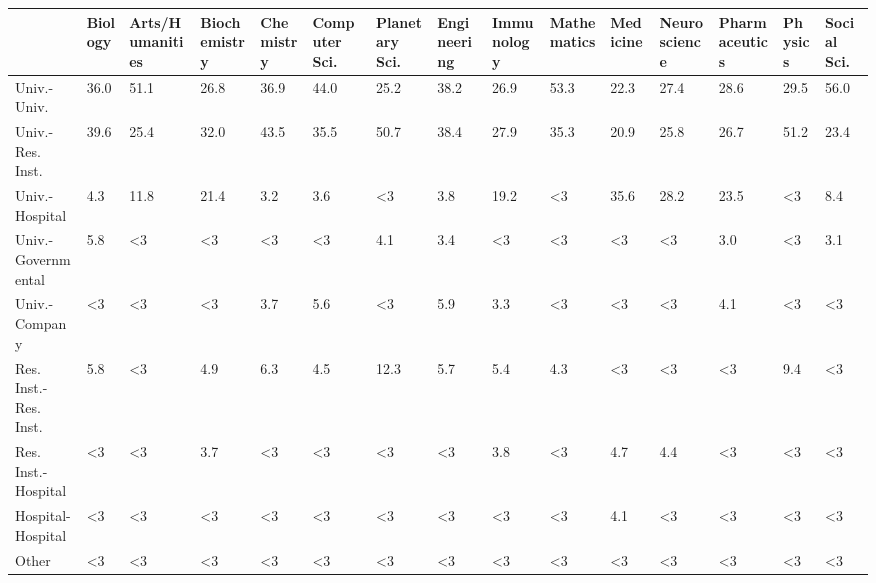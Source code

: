 \begin{tabular}{lllllllllllllll}
\toprule
{} & Biology & Arts/Humanities & Biochemistry & Chemistry & Computer Sci. & Planetary Sci. & Engineering & Immunology & Mathematics & Medicine & Neuroscience & Pharmaceutics & Physics & Social Sci. \\
\midrule
Univ.-Univ.           &    36.0 &            51.1 &         26.8 &      36.9 &          44.0 &           25.2 &        38.2 &       26.9 &        53.3 &     22.3 &         27.4 &          28.6 &    29.5 &        56.0 \\
Univ.-Res. Inst.      &    39.6 &            25.4 &         32.0 &      43.5 &          35.5 &           50.7 &        38.4 &       27.9 &        35.3 &     20.9 &         25.8 &          26.7 &    51.2 &        23.4 \\
Univ.-Hospital        &     4.3 &            11.8 &         21.4 &       3.2 &           3.6 &             <3 &         3.8 &       19.2 &          <3 &     35.6 &         28.2 &          23.5 &      <3 &         8.4 \\
Univ.-Governmental    &     5.8 &              <3 &           <3 &        <3 &            <3 &            4.1 &         3.4 &         <3 &          <3 &       <3 &           <3 &           3.0 &      <3 &         3.1 \\
Univ.-Company         &      <3 &              <3 &           <3 &       3.7 &           5.6 &             <3 &         5.9 &        3.3 &          <3 &       <3 &           <3 &           4.1 &      <3 &          <3 \\
Res. Inst.-Res. Inst. &     5.8 &              <3 &          4.9 &       6.3 &           4.5 &           12.3 &         5.7 &        5.4 &         4.3 &       <3 &           <3 &            <3 &     9.4 &          <3 \\
Res. Inst.-Hospital   &      <3 &              <3 &          3.7 &        <3 &            <3 &             <3 &          <3 &        3.8 &          <3 &      4.7 &          4.4 &            <3 &      <3 &          <3 \\
Hospital-Hospital     &      <3 &              <3 &           <3 &        <3 &            <3 &             <3 &          <3 &         <3 &          <3 &      4.1 &           <3 &            <3 &      <3 &          <3 \\
Other                 &      <3 &              <3 &           <3 &        <3 &            <3 &             <3 &          <3 &         <3 &          <3 &       <3 &           <3 &            <3 &      <3 &          <3 \\
\bottomrule
\end{tabular}
